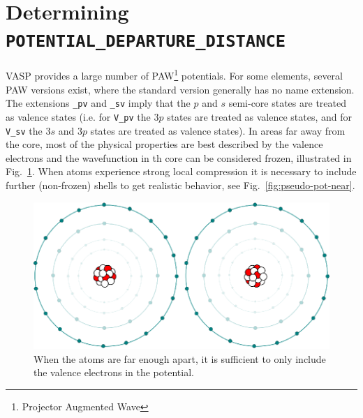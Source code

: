 \documentclass{article}
\begin{document}
\section{Determining \texttt{POTENTIAL\_DEPARTURE\_DISTANCE}}
VASP provides a large number of PAW\footnote{Projector Augmented Wave} potentials. For some elements, several PAW versions exist, where the standard version generally has no name extension. The extensions \texttt{\_pv} and \texttt{\_sv} imply that the $p$ and $s$ semi-core states are treated as valence states (i.e. for \texttt{V\_pv} the $3p$ states are treated as valence states, and for \texttt{V\_sv} the $3s$ and $3p$ states are treated as valence states). In areas far away from the core, most of the physical properties are best described by the valence electrons and the wavefunction in th core can be considered frozen, illustrated in Fig.~\ref{fig:pseudo-pot-far}. When atoms experience strong local compression it is necessary to include further (non-frozen) shells to get realistic behavior, see Fig.~\ref{fig:pseudo-pot-near}.



\begin{figure}[H]
  \centering
  \includegraphics[scale=0.9]{img/pseudo-pot-far.eps}
  \caption{When the atoms are far enough apart, it is sufficient to only include the valence electrons in the potential.}
  \label{fig:pseudo-pot-far}
\end{figure}
\end{document}
